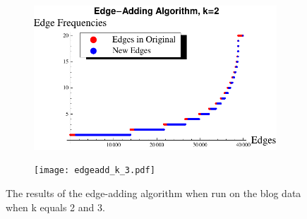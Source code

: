 \begin{figure}[htb]
\centering
\begin{subfigure}{0.5\textwidth}
	\centering
	\includegraphics[width=1\linewidth]{edgeadd_k_2.pdf}
	\label{fig:edge-adding k=2}
\end{subfigure}%
\begin{subfigure}{0.5\textwidth}
	\centering
	\texttt{[image: edgeadd\_k\_3.pdf]}
	\label{fig:edge-adding k=2}
\end{subfigure}%
\caption{The results of the edge-adding algorithm when run on the blog data when k equals 2 and 3. }
\end{figure}

%

